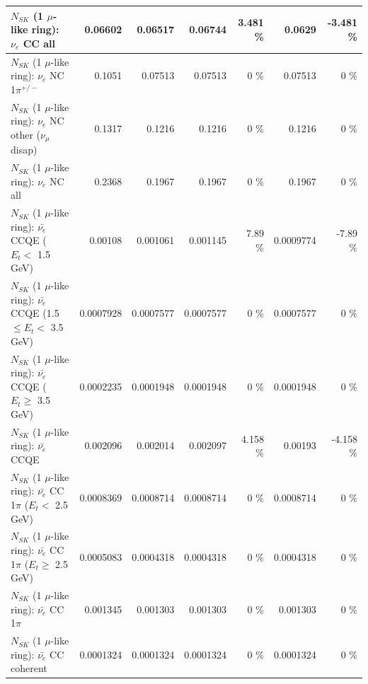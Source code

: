 \begin{table}
\begin{tabular}{| l | r | r | r  r | r  r |}
                                  $N_{SK}$ (1 $\mu$-like ring): $\nu_{e}$ CC all &         0.06602 &         0.06517 &         0.06744 &    3.481 \%  &          0.0629 &   -3.481 \%  \\ 
\hline
                           $N_{SK}$ (1 $\mu$-like ring): $\nu_e$ NC 1$\pi^{+/-}$ &          0.1051 &         0.07513 &         0.07513 &        0 \%  &         0.07513 &        0 \%  \\ 
                $N_{SK}$ (1 $\mu$-like ring): $\nu_e$ NC other ($\nu_\mu$ disap) &          0.1317 &          0.1216 &          0.1216 &        0 \%  &          0.1216 &        0 \%  \\ 
                                  $N_{SK}$ (1 $\mu$-like ring): $\nu_{e}$ NC all &          0.2368 &          0.1967 &          0.1967 &        0 \%  &          0.1967 &        0 \%  \\ 
\hline
\hline
\hline
            $N_{SK}$ (1 $\mu$-like ring): $\bar{\nu_e}$ CCQE ($E_{t} <$ 1.5 GeV) &         0.00108 &        0.001061 &        0.001145 &     7.89 \%  &       0.0009774 &    -7.89 \%  \\ 
   $N_{SK}$ (1 $\mu$-like ring): $\bar{\nu_e}$ CCQE (1.5 $\leq E_{t} <$ 3.5 GeV) &       0.0007928 &       0.0007577 &       0.0007577 &        0 \%  &       0.0007577 &        0 \%  \\ 
         $N_{SK}$ (1 $\mu$-like ring): $\bar{\nu_e}$ CCQE ($E_{t} \geq$ 3.5 GeV) &       0.0002235 &       0.0001948 &       0.0001948 &        0 \%  &       0.0001948 &        0 \%  \\ 
\hline
                                $N_{SK}$ (1 $\mu$-like ring): $\bar{\nu_e}$ CCQE &        0.002096 &        0.002014 &        0.002097 &    4.158 \%  &         0.00193 &   -4.158 \%  \\ 
\hline
       $N_{SK}$ (1 $\mu$-like ring): $\bar{\nu_e}$ CC 1$\pi$ ($E_{t} <$ 2.5 GeV) &       0.0008369 &       0.0008714 &       0.0008714 &        0 \%  &       0.0008714 &        0 \%  \\ 
    $N_{SK}$ (1 $\mu$-like ring): $\bar{\nu_e}$ CC 1$\pi$ ($E_{t} \geq$ 2.5 GeV) &       0.0005083 &       0.0004318 &       0.0004318 &        0 \%  &       0.0004318 &        0 \%  \\ 
\hline
                           $N_{SK}$ (1 $\mu$-like ring): $\bar{\nu_e}$ CC 1$\pi$ &        0.001345 &        0.001303 &        0.001303 &        0 \%  &        0.001303 &        0 \%  \\ 
                         $N_{SK}$ (1 $\mu$-like ring): $\bar{\nu_e}$ CC coherent &       0.0001324 &       0.0001324 &       0.0001324 &        0 \%  &       0.0001324 &        0 \%  \\ 

\end{tabular}
\end{table}
